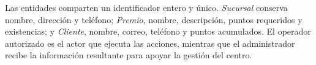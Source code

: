 Las entidades comparten un identificador entero y único. \emph{Sucursal}
conserva nombre, dirección y teléfono; \emph{Premio}, nombre, descripción,
puntos requeridos y existencias; y \emph{Cliente}, nombre, correo, teléfono y
puntos acumulados. El operador autorizado es el actor que ejecuta las acciones,
mientras que el administrador recibe la información resultante para apoyar la
gestión del centro.
